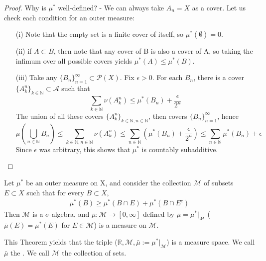 \documentclass[11pt]{scrartcl}
\begin{document}
\begin{proof}
Why is $\mu^*$ well-defined? - We can always take $A_n = X$ as a cover.
Let us check each condition for an outer measure:
\begin{itemize}
\item[(i)] Note that the empty set is a finite cover of itself, so $\mu^*(\emptyset) = 0$.
\item[(ii)] if $ A \subset B$, then note that any cover of B is also a cover of A, so taking the infimum over all possible covers yields $\mu^*(A)\leq \mu^*(B)$.
\item[(iii)] Take any $\{B_n\}_{n=1}^\infty \subset \mathcal{P}(X)$. Fix $\epsilon >0$. For each $B_n$, there is a cover  $\{A_{k}^n\}_{k\in \mathbb{N}}\subset \mathcal{A}$ such that 
$$\sum_{k \in \mathbb{N}} \nu(A_k^n) \leq \mu^*(B_n) + \frac{\epsilon}{2^n}$$
The union of all these covers $\{A_{k}^n\}_{k\in \mathbb{N},n\in \mathbb{N}}$, then covers $\{B_n\}_{n=1}^\infty$, hence 
$$\mu(\bigcup_{n\in \mathbb{N}} B_n ) \leq \sum_{k \in \mathbb{N},n \in \mathbb{N}} \nu(A_k^n) \leq \sum_{n \in \mathbb{N}} (\mu^*(B_n) + \frac{\epsilon}{2^n})
\leq \sum_{n \in \mathbb{N}} \mu^*(B_n) + \epsilon $$
Since $\epsilon$ was arbitrary, this shows that $\mu^*$ is countably subadditive.
\end{itemize}

\end{proof}



\begin{theorem}
Let $\mu^*$ be an outer measure on X, and consider the collection $\mathcal{M}$ of subsets $E \subset X$ such that for every $B \subset X$,
\begin{align}
\mu^*(B) \geq \mu^*(B\cap E) + \mu^*(B \cap E^c)\tag{*}
\end{align}
Then $\mathcal{M}$ is a $\sigma$-algebra, and $\bar{\mu}: \mathcal{M} \rightarrow [0,\infty]$ defined by $\bar{\mu} = \mu^*|_\mathcal{M}$ ($\bar{\mu}(E) = \mu^*(E)$ for $E\in \mathcal{M}$) is a measure on $\mathcal{M}$.
\end{theorem}

\begin{example}
This Theorem yields that the triple ($\mathbb{R},\mathcal{M},\bar{\mu}:=\mu^*|_\mathcal{M} $) is a measure space. We call $\bar{\mu}$ the . We call $\mathcal{M}$ the collection of  sets.
\end{example}
\end{document}
